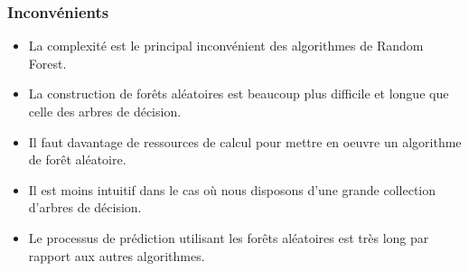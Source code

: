 \subsubsection{Inconvénients}
\begin{itemize}
  \item La complexité est le principal inconvénient des algorithmes de Random
    Forest.
  \item La construction de forêts aléatoires est beaucoup plus
    difficile et longue que celle des arbres de décision.
  \item Il faut davantage de ressources de calcul pour mettre en oeuvre
    un algorithme de forêt aléatoire.
  \item Il est moins intuitif dans le cas où nous disposons d'une grande
    collection d'arbres de décision.
  \item Le processus de prédiction utilisant les forêts aléatoires est très long
    par rapport aux autres algorithmes.
\end{itemize}



